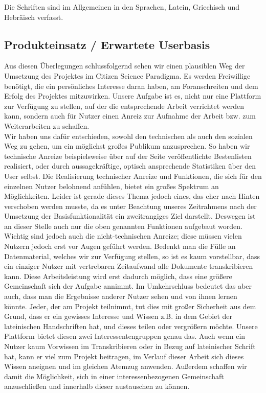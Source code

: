 \documentclass{article}
\begin{document}
Die Schriften sind im Allgemeinen in den Sprachen, Latein, Griechisch und Hebräisch verfasst.

\subsection{Produkteinsatz / Erwartete Userbasis}
Aus diesen Überlegungen schlussfolgernd sehen wir einen plausiblen Weg der Umsetzung des Projektes im Citizen Science Paradigma.
Es werden Freiwillige benötigt, die ein persönliches Interesse daran haben, am Foranschreiten und dem Erfolg des Projektes mitzuwirken.
Unsere Aufgabe ist es, nicht nur eine Plattform zur Verfügung zu stellen, auf der die entsprechende Arbeit verrichtet werden kann,
sondern auch für Nutzer einen Anreiz zur Aufnahme der Arbeit bzw. zum Weiterarbeiten zu schaffen.\\
Wir haben uns dafür entschieden, sowohl den technischen als auch den sozialen Weg zu gehen, um ein möglichst großes Publikum anzusprechen.
So haben wir technische Anreize beispielsweise über auf der Seite veröffentlichte Bestenlisten realisiert, oder durch aussagekräftige,
optisch ansprechende Statistiken über den User selbst. Die Realisierung technischer Anreize und Funktionen,
die sich für den einzelnen Nutzer belohnend anfühlen, bietet ein großes Spektrum an Möglichkeiten.
Leider ist gerade dieses Thema jedoch eines, das eher nach Hinten verschoben werden musste,
da es unter Beachtung unseres Zeitrahmens nach der Umsetzung der Basisfunktionalität ein zweitrangiges Ziel darstellt.
Deswegen ist an dieser Stelle auch nur die oben genannten Funktionen aufgebaut worden.\\
Wichtig sind jedoch auch die nicht-technischen Anreize; diese müssen vielen Nutzern jedoch erst vor Augen geführt werden.
Bedenkt man die Fülle an Datenmaterial, welches wir zur Verfügung stellen, so ist es kaum vorstellbar,
dass ein einziger Nutzer mit vertrebaren Zeitaufwand alle Dokumente transkribieren kann.
Diese Arbeitsleistung wird erst dadurch möglich, dass eine größere Gemeinschaft sich der Aufgabe annimmt.
Im Umkehrschluss bedeutet das aber auch, dass man die Ergebnisse anderer Nutzer sehen und von ihnen lernen könnte.
Jeder, der am Projekt teilnimmt, tut dies mit großer Sicherheit aus dem Grund,
dass er ein gewisses Interesse und Wissen z.B. in dem Gebiet der lateinischen Handschriften hat, und dieses teilen oder vergrößern möchte.
Unsere Plattform bietet diesen zwei Interessentengruppen genau das.
Auch wenn ein Nutzer kaum Vorwissen im Transkribieren oder in Bezug auf lateinischer Schrift hat, kann er viel zum Projekt beitragen,
im Verlauf dieser Arbeit sich dieses Wissen aneignen und im gleichen Atemzug anwenden.
Außerdem schaffen wir damit die Möglichkeit, sich in einer interessenbezogenen Gemeinschaft anzuschließen und innerhalb dieser austauschen zu können.
\end{document}

